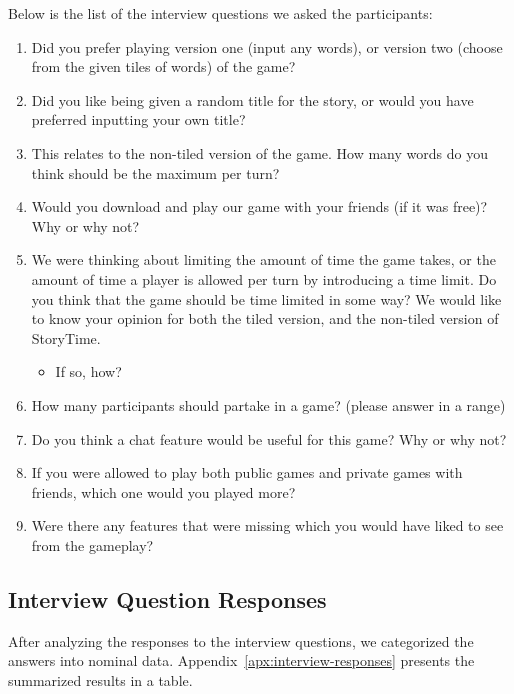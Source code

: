 \documentclass{sigchi}
\begin{document}
Below is the list of the interview questions we asked the participants:
\begin{enumerate}[leftmargin=.5in, noitemsep]
    \item Did you prefer playing version one (input any words), or version two (choose from the given tiles of words) of the game? 

    \item Did you like being given a random title for the story, or would you have preferred inputting your own title?

    \item This relates to the non-tiled version of the game. How many words do you think should be the maximum per turn?

    \item Would you download and play our game with your friends (if it was free)? Why or why not?

    \item We were thinking about limiting the amount of time the game takes, or the amount of time a player is allowed per turn by introducing a time limit. Do you think that the game should be time limited in some way? We would like to know your opinion for both the tiled version, and the non-tiled version of StoryTime.
        \begin{itemize}[noitemsep]
            \item If so, how?
        \end{itemize}

    \item How many participants should partake in a game? (please answer in a range)
    
    \item Do you think a chat feature would be useful for this game? Why or why not?
    
    \item If you were allowed to play both public games and private games with friends, which one would you played more?
    
    \item Were there any features that were missing which you would have liked to see from the gameplay?
\end{enumerate}


\subsection{Interview Question Responses}
After analyzing the responses to the interview questions, we categorized the answers into nominal data. Appendix~\ref{apx:interview-responses} presents the summarized results in a table. 
\end{document}
